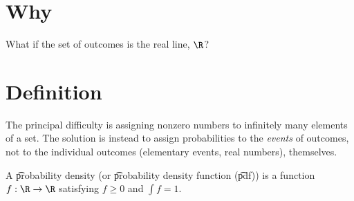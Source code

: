 
\section*{Why}

What if the set of outcomes is the real line, $\R $?

\section*{Definition}

The principal difficulty is assigning nonzero numbers to infinitely many elements of a set.
The solution is instead to assign probabilities to the \textit{events} of outcomes, not to the individual outcomes (elementary events, real numbers), themselves.

A \t{probability density} (or \t{probability density function} (\t{pdf})) is a function $f: \R  \to \R  $ satisfying $f \geq 0$ and $\int  f = 1$.

\blankpage